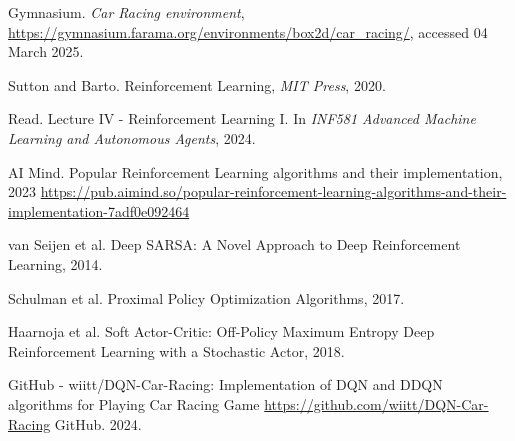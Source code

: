\documentclass[../CSC_52081_EP.tex]{subfiles}
\begin{document}
    \begin{thebibliography}{4}
            Gymnasium. \textit{Car Racing environment}, \url{https://gymnasium.farama.org/environments/box2d/car_racing/}, accessed 04 March 2025.

        Sutton and Barto. Reinforcement Learning,
        {\em MIT Press}, 2020.

            Read. Lecture IV - Reinforcement Learning I. In \textit{INF581 Advanced Machine Learning and Autonomous Agents}, 2024.

            AI Mind. Popular Reinforcement Learning algorithms and their implementation, 2023 \url{https://pub.aimind.so/popular-reinforcement-learning-algorithms-and-their-implementation-7adf0e092464}
        
            van Seijen et al. Deep SARSA: A Novel Approach to Deep Reinforcement Learning, 2014.
        
            Schulman et al. Proximal Policy Optimization Algorithms, 2017.

            Haarnoja et al. Soft Actor-Critic: Off-Policy Maximum Entropy Deep Reinforcement Learning with a Stochastic Actor, 2018.

            GitHub - wiitt/DQN-Car-Racing: Implementation of DQN and DDQN algorithms for Playing Car Racing Game \url{https://github.com/wiitt/DQN-Car-Racing} GitHub. 2024.
         

        \end{thebibliography}
\end{document}
